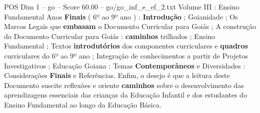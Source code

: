 \begin{textsample}{POS Dim 1 – go – Score 60.00 – go/go\_inf\_e\_ef\_2.txt}
Volume III : Ensino Fundamental Anos \textbf{Finais} ( 6º ao 9º ano ) : \textbf{Introdução} ; Goianidade ; Os Marcos Legais que \textbf{embasam} o Documento Curricular para Goiás ; A construção do Documento Curricular para Goiás : \textbf{caminhos} trilhados ; Ensino Fundamental ; Textos \textbf{introdutórios} dos componentes curriculares e \textbf{quadros} curriculares do 6º ao 9º ano ; Integração de conhecimentos a partir de Projetos Investigativos ; Educação Goiana : Temas \textbf{Contemporâneos} e Diversidades : Considerações \textbf{Finais} e Referências.
Enfim, o desejo é que a leitura deste Documento suscite reflexões e oriente \textbf{caminhos} sobre o desenvolvimento das aprendizagens essenciais das crianças da Educação Infantil e dos estudantes do Ensino Fundamental ao longo da Educação Básica.

\end{textsample}

